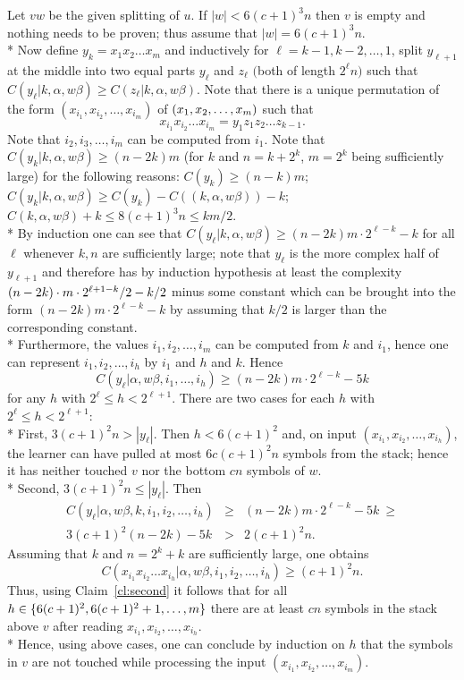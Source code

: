 \documentclass{LMCS}
\theoremstyle{plain}\newtheorem{athm}[thm]{Theorem}
\theoremstyle{plain}\newtheorem{aprop}[thm]{Proposition}
\theoremstyle{plain}\newtheorem{aprob}[thm]{Open Problem}
\theoremstyle{plain}\newtheorem{acor}[thm]{Corollary}
\theoremstyle{plain}\newtheorem{alem}[thm]{Lemma}
\theoremstyle{definition}\newtheorem{adefn}[thm]{Definition}
\theoremstyle{definition}\newtheorem{arem}[thm]{Remark}
\theoremstyle{plain}\newtheorem{aexmp}[thm]{Example}
\theoremstyle{plain}\newtheorem{aclm}[thm]{Claim}
\def\sp{\\*\indent}
\begin{document}
\noindent
Let $vw$ be the given splitting of $u$.
If $|w| < 6(c+1)^3n$ then $v$ is empty and nothing needs to be proven;
thus assume that $|w| = 6(c+1)^3n$.
\sp
Now define $y_k = x_1 x_2 \ldots x_m$
and inductively for $\ell = k-1,k-2,\ldots,1$, split $y_{\ell+1}$ at the
middle into two equal parts $y_{\ell}$ and $z_\ell$ 
$($both of length $2^{\ell}n)$ such that
$C(y_\ell | k,\alpha,w\beta) \geq C(z_\ell | k,\alpha,w\beta)$. Note
that there is a unique permutation
of the form $(x_{i_1},x_{i_2},\ldots,x_{i_m})$ of
$(x_1, \linebreak[3] x_2, \linebreak[3] \ldots, \linebreak[3] x_m)$
such that
$$
   x_{i_1} x_{i_2} \ldots x_{i_m} = y_1 z_1 z_2 \ldots z_{k-1}.
$$
Note that $i_2,i_3,\ldots,i_m$ can be computed from $i_1$.
Note that $C(y_k | k,\alpha,w\beta) \geq (n-2k)m$ 
(for $k$ and $n = k+2^k$, $m=2^k$ being sufficiently large)
for the following reasons:
$C(y_k) \geq (n-k)m$;
$C(y_k | k,\alpha,w\beta) \geq C(y_k)-C((k,\alpha,w\beta))-k$;
$C(k,\alpha,w\beta)+k \leq 8(c+1)^3n \leq km/2$.
\sp
By induction one can see that
$C(y_\ell | k,\alpha,w\beta) \geq (n-2k)m \cdot 2^{\ell-k}-k$ for all $\ell$
whenever $k,n$ are sufficiently large; note that $y_{\ell}$ is the more
complex half of $y_{\ell+1}$ and therefore has by induction hypothesis
at least the complexity $(n-2k)\linebreak[3] \cdot m \cdot 2^{\ell+1-k}/2-k/2$
minus some constant
which can be brought into the form $(n-2k)m \cdot 2^{\ell-k}-k$ by
assuming that $k/2$ is larger than the corresponding constant.
\sp
Furthermore, the values $i_1,i_2,\ldots,i_m$ can be computed from $k$ and
$i_1$, hence one can represent $i_1,i_2,\ldots,i_h$
by $i_1$ and $h$ and $k$. Hence
$$
   C(y_\ell | \alpha,w\beta,i_1,\ldots,i_h) \geq (n-2k)m \cdot 2^{\ell-k} - 5k
$$
for any $h$ with $2^{\ell} \leq h < 2^{\ell+1}$.
There are two cases for each $h$ with $2^{\ell} \leq h < 2^{\ell+1}$:
\sp
First, $3(c+1)^2 n > |y_\ell|$. Then $h < 6(c+1)^2$ and,
on input $(x_{i_1},x_{i_2},\ldots,x_{i_h})$, the learner
can have pulled at most $6c(c+1)^2n$ symbols
from the stack; hence it has neither touched $v$ nor the bottom
$cn$ symbols of $w$.
\sp
Second, $3(c+1)^2 n \leq |y_\ell|$. Then 
\begin{eqnarray*}
   C(y_\ell | \alpha,w\beta,k,i_1,i_2,\ldots,i_h) & \geq &
   (n-2k)m \cdot 2^{\ell-k} - 5k \ \geq \\
       3(c+1)^2(n-2k) - 5k & > & 2(c+1)^2n.
\end{eqnarray*}
Assuming that $k$ and $n = 2^k+k$ are sufficiently large, one obtains
$$
   C(x_{i_1}x_{i_2}\ldots x_{i_h}| \alpha,w\beta,i_1,i_2,\ldots,i_h)
\geq (c+1)^2n.
$$
Thus, using Claim~\ref{cl:second} it follows that for all 
$h \in \{6(c+1)^2,6(c+1)^2+1,\linebreak[3] \ldots,m\}$ 
there are at least $cn$ symbols in the stack above $v$ after reading
$x_{i_1},x_{i_2},\ldots,x_{i_h}$.
\sp
Hence, using above cases, one can conclude by induction on $h$ that the
symbols in $v$ are not touched while processing the input
$(x_{i_1},x_{i_2},\ldots,x_{i_m})$.
\end{document}

